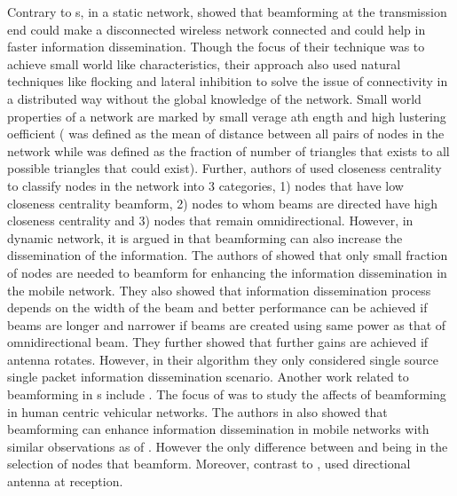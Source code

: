\documentclass[preprint, twocolumn,5p]{elsarticle}
\begin{document}
Contrary to s, in a static network, \cite{Agarwal2011,Agarwal2012} showed that beamforming at the transmission end could make a disconnected wireless network connected and could help in faster information dissemination. Though the focus of their technique was to achieve small world like characteristics, their approach also used natural techniques like flocking and lateral inhibition to solve the issue of connectivity in a distributed way without the global knowledge of the network. Small world properties of a network are marked by small verage ath ength and high lustering oefficient ( was defined as the mean of distance between all pairs of nodes in the network while  was defined as the fraction of number of triangles that exists to all possible triangles that could exist). Further, authors of \cite{Agarwal2011,Agarwal2012} used closeness centrality \cite{Freeman1979} to classify nodes in the network into 3 categories, 1) nodes that have low closeness centrality beamform, 2) nodes to whom beams are directed have high closeness centrality and 3) nodes that remain omnidirectional. However, in dynamic network, it is argued in \cite{Peruani2010} that beamforming can also increase the dissemination of the information. The authors of \cite{Peruani2010} showed that only small fraction of nodes are needed to beamform for enhancing the information dissemination in the mobile network. They also showed that information dissemination process depends on the width of the beam and better performance can be achieved if beams are longer and narrower if beams are created using same power as that of omnidirectional beam. They further showed that further gains are achieved if antenna rotates. However, in their algorithm they only considered single source single packet information dissemination scenario. Another work related to beamforming in s include \cite{Li2012}. The focus of \cite{Li2012} was to study the affects of beamforming in human centric vehicular networks. The authors in \cite{Li2012} also showed that beamforming can enhance information dissemination in mobile networks with similar observations as of \cite{Peruani2010}. However the only difference between \cite{Peruani2010} and \cite{Li2012} being in the selection of nodes that beamform. Moreover, contrast to \cite{Agarwal2011,Agarwal2012}, \cite{Li2012} used directional antenna at reception.
\end{document}
